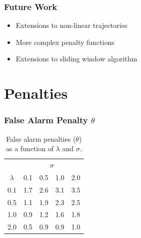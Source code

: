 \documentclass{beamer}
\begin{document}
\begin{frame}
\frametitle{Future Work}
\begin{itemize}
\item Extensions to non-linear trajectories
\item More complex penalty functions
\item Extensions to sliding window algorithm
\end{itemize} 
\end{frame}

\appendix
\section{Penalties}

\begin{frame}[noframenumbering]
\frametitle{False Alarm Penalty $\theta$}
\begin{table}
\centering
\begin{tabular}{c|m{1cm}m{1cm}m{1cm}m{1cm}}
  \hline
   & \multicolumn{4}{c}{$\sigma$} \\
   \cline{2-5}
   $\lambda$ & 0.1 & 0.5 & 1.0 & 2.0\\
  \hline
  \hline
   0.1 & 1.7 & 2.6 & 3.1 & 3.5 \\
   0.5 & 1.1 & 1.9 & 2.3 & 2.5 \\ 
   1.0 & 0.9 & 1.2 & 1.6 & 1.8 \\ 
   2.0 & 0.5 & 0.9 & 0.9 & 1.0 \\ 
   \hline
\end{tabular}
\caption{False alarm penalties ($\theta$) as a function of $\lambda$ and $\sigma$.}
\end{table}
\end{frame}
\end{document}
